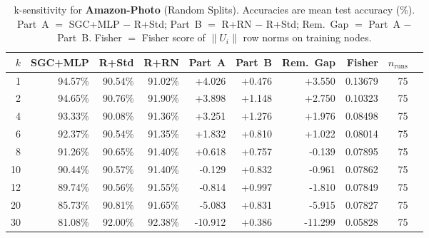 \begin{table}[t]
\centering\small\setlength{\tabcolsep}{5pt}
\caption{k-sensitivity for \textbf{Amazon-Photo} (Random Splits). Accuracies are mean test accuracy (\%). Part~A $=$ SGC+MLP $-$ R+Std; Part~B $=$ R+RN $-$ R+Std; Rem.~Gap $=$ Part~A $-$ Part~B. Fisher $=$ Fisher score of $\|U_i\|$ row norms on training nodes.}
\label{tab:exp8_per_dataset_amazon-photo_random}
\begin{tabular}{rrrrrrrrrr}
\toprule
$k$ & SGC+MLP & R+Std & R+RN & Part~A & Part~B & Rem.~Gap & Fisher & $n_{\mathrm{runs}}$ \\
\midrule
1 & 94.57\% & 90.54\% & 91.02\% & +4.026 & +0.476 & +3.550 & 0.13679 & 75 \\
2 & 94.65\% & 90.76\% & 91.90\% & +3.898 & +1.148 & +2.750 & 0.10323 & 75 \\
4 & 93.33\% & 90.08\% & 91.36\% & +3.251 & +1.276 & +1.976 & 0.08498 & 75 \\
6 & 92.37\% & 90.54\% & 91.35\% & +1.832 & +0.810 & +1.022 & 0.08014 & 75 \\
8 & 91.26\% & 90.65\% & 91.40\% & +0.618 & +0.757 & -0.139 & 0.07895 & 75 \\
10 & 90.44\% & 90.57\% & 91.40\% & -0.129 & +0.832 & -0.961 & 0.07862 & 75 \\
12 & 89.74\% & 90.56\% & 91.55\% & -0.814 & +0.997 & -1.810 & 0.07849 & 75 \\
20 & 85.73\% & 90.81\% & 91.65\% & -5.083 & +0.831 & -5.915 & 0.07827 & 75 \\
30 & 81.08\% & 92.00\% & 92.38\% & -10.912 & +0.386 & -11.299 & 0.05828 & 75 \\
\bottomrule
\end{tabular}
\end{table}
